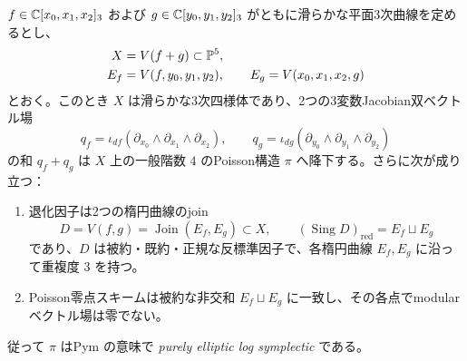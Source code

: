 \begin{proposition}
\label{prop:pg-split-elliptic}
$f\in\mathbb C[x_0,x_1,x_2]_3$ および $g\in\mathbb C[y_0,y_1,y_2]_3$ がともに滑らかな平面3次曲線を定めるとし、
\begin{equation}
\begin{aligned}
X&=V(f+g)\subset\mathbb P^5,\\
E_f&=V(f,y_0,y_1,y_2),\qquad
E_g=V(x_0,x_1,x_2,g)
\end{aligned}
\label{eq:pg-split-fourfold}
\end{equation}
とおく。このとき $X$ は滑らかな3次四様体であり、2つの3変数Jacobian双ベクトル場
\[
  q_f=\iota_{df}(\partial_{x_0}\wedge\partial_{x_1}\wedge\partial_{x_2}),\qquad
  q_g=\iota_{dg}(\partial_{y_0}\wedge\partial_{y_1}\wedge\partial_{y_2})
\]
の和 $q_f+q_g$ は $X$ 上の一般階数 $4$ のPoisson構造 $\pi$ へ降下する。さらに次が成り立つ：
\begin{enumerate}
  \item 退化因子は2つの楕円曲線のjoin
  \begin{equation}
  D=V(f,g)=\operatorname{Join}(E_f,E_g)\subset X,
  \qquad
  (\operatorname{Sing}D)_{\mathrm{red}}=E_f\sqcup E_g
  \label{eq:pg-split-elliptic-divisor}
  \end{equation}
  であり、$D$ は被約・既約・正規な反標準因子で、各楕円曲線 $E_f,E_g$ に沿って重複度 $3$ を持つ。
  \item Poisson零点スキームは被約な非交和 $E_f\sqcup E_g$ に一致し、その各点でmodularベクトル場は零でない。
\end{enumerate}
従って $\pi$ はPym \cite[Definition~4.2]{PPymElliptic} の意味で \emph{purely elliptic log symplectic} である。
\end{proposition}
